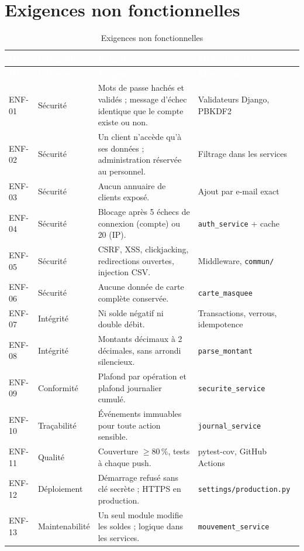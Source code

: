 \documentclass[11pt,a4paper]{report}
\newcommand{\entete}{\rowcolor{primaire}}
\newcommand{\tete}[1]{\textcolor{white}{\textbf{#1}}}
\newcommand{\code}[1]{\texttt{\small #1}}
\begin{document}
\section{Exigences non fonctionnelles}

\begin{longtable}{@{}p{1.4cm}p{2.5cm}p{6.1cm}p{4.1cm}@{}}
\caption{Exigences non fonctionnelles}\\
\toprule
\entete \tete{ID} & \tete{Catégorie} & \tete{Exigence} & \tete{Mise en œuvre} \\
\midrule
\endfirsthead
\toprule
\entete \tete{ID} & \tete{Catégorie} & \tete{Exigence} & \tete{Mise en œuvre} \\
\midrule
\endhead
ENF-01 & Sécurité & Mots de passe hachés et validés ; message d'échec identique que le compte existe ou non. & Validateurs Django, PBKDF2 \\
ENF-02 & Sécurité & Un client n'accède qu'à ses données ; administration réservée au personnel. & Filtrage dans les services \\
ENF-03 & Sécurité & Aucun annuaire de clients exposé. & Ajout par e-mail exact \\
ENF-04 & Sécurité & Blocage après 5 échecs de connexion (compte) ou 20 (IP). & \code{auth\_service} + cache \\
ENF-05 & Sécurité & CSRF, XSS, clickjacking, redirections ouvertes, injection CSV. & Middleware, \code{commun/} \\
ENF-06 & Sécurité & Aucune donnée de carte complète conservée. & \code{carte\_masquee} \\
ENF-07 & Intégrité & Ni solde négatif ni double débit. & Transactions, verrous, idempotence \\
ENF-08 & Intégrité & Montants décimaux à 2 décimales, sans arrondi silencieux. & \code{parse\_montant} \\
ENF-09 & Conformité & Plafond par opération et plafond journalier cumulé. & \code{securite\_service} \\
ENF-10 & Traçabilité & Événements immuables pour toute action sensible. & \code{journal\_service} \\
ENF-11 & Qualité & Couverture $\geq 80$\,\%, tests à chaque push. & pytest-cov, GitHub Actions \\
ENF-12 & Déploiement & Démarrage refusé sans clé secrète ; HTTPS en production. & \code{settings/production.py} \\
ENF-13 & Maintenabilité & Un seul module modifie les soldes ; logique dans les services. & \code{mouvement\_service} \\
\bottomrule
\end{longtable}
\end{document}
